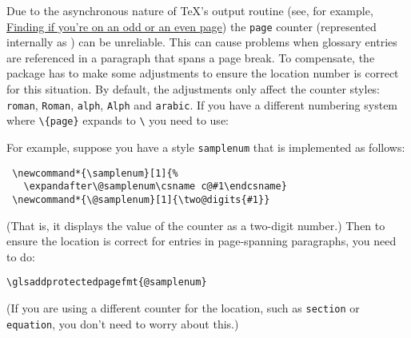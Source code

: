 \documentclass[report,inlinetitle]{nlctdoc}
\newcounter{sample}
\begin{document}
Due to the asynchronous nature of \TeX's output routine (see,
for example,
\href{http://www.tex.ac.uk/cgi-bin/texfaq2html?label=oddpage}{Finding
if you're on an odd or an even page}) the \texttt{page} counter
(represented internally as ) can be unreliable.
This can cause problems when glossary entries are referenced in a
paragraph that spans a page break. To compensate, the
 package has to make some adjustments to ensure
the location number is correct for this situation. By default,
the adjustments only affect the counter styles: \texttt{roman},
\texttt{Roman}, \texttt{alph}, \texttt{Alph} and \texttt{arabic}.
If you have a different numbering system where 
\verb|\|\verb|{page}| expands to
\verb|\| you need to use:
\begin{definition}[\DescribeMacro\glsaddprotectedpagefmt]
\end{definition}

For example, suppose you have a style \texttt{samplenum} that is
implemented as follows:
\begin{verbatim}
 \newcommand*{\samplenum}[1]{%
   \expandafter\@samplenum\csname c@#1\endcsname}
 \newcommand*{\@samplenum}[1]{\two@digits{#1}}

\end{verbatim}
(That is, it displays the value of the counter as a two-digit
number.) Then to ensure the location is correct for entries in 
page-spanning paragraphs, you need to do:
\begin{verbatim}
\glsaddprotectedpagefmt{@samplenum}
\end{verbatim}
(If you are using a different counter for the location, such as
\texttt{section} or \texttt{equation}, you don't need to worry about
this.)
\end{document}

